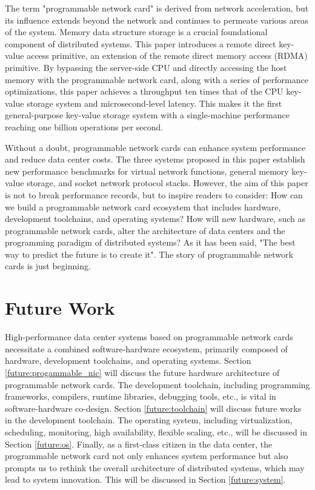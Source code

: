 The term "programmable network card" is derived from network acceleration, but its influence extends beyond the network and continues to permeate various areas of the system. Memory data structure storage is a crucial foundational component of distributed systems. This paper introduces a remote direct key-value access primitive, an extension of the remote direct memory access (RDMA) primitive. By bypassing the server-side CPU and directly accessing the host memory with the programmable network card, along with a series of performance optimizations, this paper achieves a throughput ten times that of the CPU key-value storage system and microsecond-level latency. This makes it the first general-purpose key-value storage system with a single-machine performance reaching one billion operations per second.

Without a doubt, programmable network cards can enhance system performance and reduce data center costs. The three systems proposed in this paper establish new performance benchmarks for virtual network functions, general memory key-value storage, and socket network protocol stacks. However, the aim of this paper is not to break performance records, but to inspire readers to consider: How can we build a programmable network card ecosystem that includes hardware, development toolchains, and operating systems? How will new hardware, such as programmable network cards, alter the architecture of data centers and the programming paradigm of distributed systems? As it has been said, "The best way to predict the future is to create it". The story of programmable network cards is just beginning.

\section{Future Work}

High-performance data center systems based on programmable network cards necessitate a combined software-hardware ecosystem, primarily composed of hardware, development toolchains, and operating systems. Section \ref{future:progammable_nic} will discuss the future hardware architecture of programmable network cards. The development toolchain, including programming frameworks, compilers, runtime libraries, debugging tools, etc., is vital in software-hardware co-design. Section \ref{future:toolchain} will discuss future works in the development toolchain. The operating system, including virtualization, scheduling, monitoring, high availability, flexible scaling, etc., will be discussed in Section \ref{future:os}. Finally, as a first-class citizen in the data center, the programmable network card not only enhances system performance but also prompts us to rethink the overall architecture of distributed systems, which may lead to system innovation. This will be discussed in Section \ref{future:system}.

